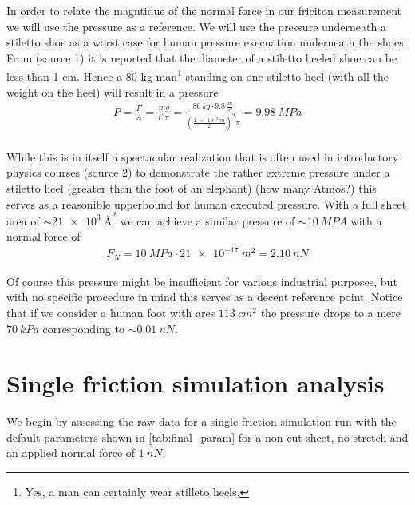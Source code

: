 In order to relate the magntidue of the normal force in our friciton measurement
we will use the pressure as a reference. We will use the pressure underneath a
stiletto shoe as a worst case for human pressure execuation underneath the
shoes. From (source 1) it is reported that the diameter of a stiletto heeled
shoe can be less than 1 cm. Hence a 80 kg man\footnote{Yes, a man can certainly
wear stilleto heels.} standing on one stiletto heel (with all the weight on the
heel) will result in a pressure
\begin{align*}
  P = \frac{F}{A} = \frac{mg}{r^2\pi} = \frac{\SI{80}{kg} \cdot \SI{9.8}{\frac{m}{s^2}}}{(\frac{\SI{1e-2}{m}}{2})^2 \pi} = \SI{9.98}{MPa} \\
\end{align*} 

While this is in itself a spectacular realization that is often used in
introductory physics courses (source 2) to demonstrate the rather extreme
pressure under a stiletto heel (greater than the foot of an elephant) (how many
Atmos?) this serves as a reasonible upperbound for human executed pressure. With
a full sheet area of $\sim\SI{21e3}{{\text{Å}}^2}$ we can achieve a similar pressure of
$\sim \SI{10}{MPA}$ with a normal force of
\begin{align*}
  F_N = \SI{10}{MPa} \cdot \SI{21e-17}{m^2} = \SI{2.10}{nN}  
\end{align*}

Of course this pressure might be insufficient for various industrial purposes,
but with no specific procedure in mind this serves as a decent reference point.
Notice that if we consider a human foot with ares $\SI{113}{cm^2}$ the pressure
drops to a mere $\SI{70}{kPa}$ corresponding to $\sim \SI{0.01}{nN}$.





\newpage
\section{Single friction simulation analysis}\label{sec:single_analysis}
We begin by assessing the raw data for a single friction simulation run with the default parameters shown in \cref{tab:final_param} for a non-cut sheet, no stretch and an applied normal force of $\SI{1}{nN}$.


